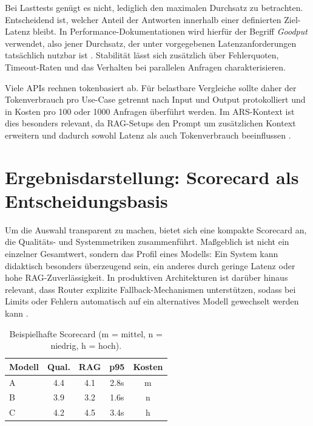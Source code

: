 Bei Lasttests genügt es nicht, lediglich den maximalen Durchsatz zu betrachten. Entscheidend ist, welcher Anteil der Antworten innerhalb einer definierten Ziel-Latenz bleibt. In Performance-Dokumentationen wird hierfür der Begriff \emph{Goodput} verwendet, also jener Durchsatz, der unter vorgegebenen Latenzanforderungen tatsächlich nutzbar ist \parencite{bentoml-inference-metrics}. Stabilität lässt sich zusätzlich über Fehlerquoten, Timeout-Raten und das Verhalten bei parallelen Anfragen charakterisieren.

Viele APIs rechnen tokenbasiert ab. Für belastbare Vergleiche sollte daher der Tokenverbrauch pro Use-Case getrennt nach Input und Output protokolliert und in Kosten pro 100 oder 1000 Anfragen überführt werden. Im ARS-Kontext ist dies besonders relevant, da RAG-Setups den Prompt um zusätzlichen Kontext erweitern und dadurch sowohl Latenz als auch Tokenverbrauch beeinflussen \parencite{fragjetzt-analyse}.

\section{Ergebnisdarstellung: Scorecard als Entscheidungsbasis}

Um die Auswahl transparent zu machen, bietet sich eine kompakte Scorecard an, die Qualitäts- und Systemmetriken zusammenführt. Maßgeblich ist nicht ein einzelner Gesamtwert, sondern das Profil eines Modells: Ein System kann didaktisch besonders überzeugend sein, ein anderes durch geringe Latenz oder hohe RAG-Zuverlässigkeit. In produktiven Architekturen ist darüber hinaus relevant, dass Router explizite Fallback-Mechanismen unterstützen, sodass bei Limits oder Fehlern automatisch auf ein alternatives Modell gewechselt werden kann \parencite{openrouter-model-fallbacks}.

\begin{table}[ht]
  \centering
  \scriptsize
  \setlength{\tabcolsep}{4pt}
  \begin{tabular}{@{}lcccc@{}}
  \toprule
  Modell & Qual. & RAG & p95 & Kosten \\
  \midrule
  A & 4.4 & 4.1 & 2.8s & m \\
  B & 3.9 & 3.2 & 1.6s & n \\
  C & 4.2 & 4.5 & 3.4s & h \\
  \bottomrule
  \end{tabular}
  \caption{Beispielhafte Scorecard (m = mittel, n = niedrig, h = hoch).}
  \label{tab:scorecard}
\end{table}

